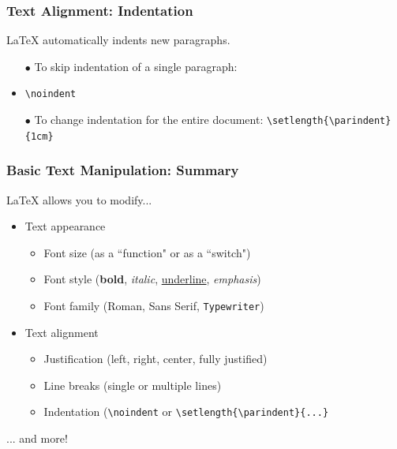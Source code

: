 \begin{frame}[fragile]
\frametitle{Text Alignment: Indentation}
\LaTeX{} automatically indents new paragraphs. 
\begin{itemize}
    \item[$\bullet$] To skip indentation of a single paragraph: 
    \item \verb|\noindent|
    \item[$\bullet$] To change indentation for the entire document: \verb|\setlength{\parindent}{1cm}|
\end{itemize}
\end{frame}



\begin{frame}[fragile]
\frametitle{Basic Text Manipulation: Summary}
\LaTeX{} allows you to modify... \pause
\begin{itemize}
    \item Text appearance
    \begin{itemize}
        \item Font size (as a ``function" or as a ``switch")
        \item Font style (\textbf{bold}, \textit{italic}, \underline{underline}, \emph{emphasis})
        \item Font family (\textrm{Roman}, \textsf{Sans Serif}, \texttt{Typewriter})
    \end{itemize} \pause
    \item Text alignment
    \begin{itemize}
        \item Justification (left, right, center, fully justified)
        \item Line breaks (single or multiple lines)
        \item Indentation \small (\verb|\noindent| or \verb|\setlength{\parindent}{...}|
    \end{itemize} \pause
\end{itemize}
... and more!
\end{frame}
